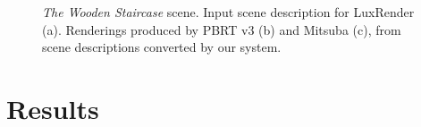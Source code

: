 \begin{figure}[h!t]
	\centering
	
	\caption{\textit{The Wooden Staircase} scene. Input scene description for LuxRender (a).
		Renderings produced by PBRT v3 (b) and Mitsuba (c),
		from scene descriptions converted by our system. }
	\label{fig:staircase}
\end{figure}

\section{Results}
\label{sec:results}

